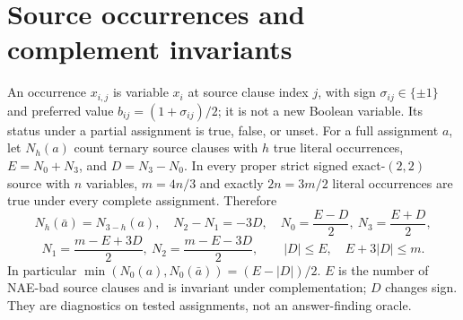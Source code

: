 \documentclass[10pt]{article}
\begin{document}
\section{Source occurrences and complement invariants}
An occurrence $x_{i,j}$ is variable $x_i$ at source clause index $j$, with sign $\sigma_{ij}\in\{\pm1\}$ and preferred value $b_{ij}=(1+\sigma_{ij})/2$; it is not a new Boolean variable. Its status under a partial assignment is true, false, or unset. For a full assignment $a$, let $N_h(a)$ count ternary source clauses with $h$ true literal occurrences, $E=N_0+N_3$, and $D=N_3-N_0$. In every proper strict signed exact-$(2,2)$ source with $n$ variables, $m=4n/3$ and exactly $2n=3m/2$ literal occurrences are true under every complete assignment. Therefore
\[
N_h(\bar a)=N_{3-h}(a),\quad N_2-N_1=-3D,\quad
N_0=\frac{E-D}{2},\ N_3=\frac{E+D}{2},
\]
\[
N_1=\frac{m-E+3D}{2},\ N_2=\frac{m-E-3D}{2},
\qquad |D|\le E,\quad E+3|D|\le m.
\]
In particular $\min(N_0(a),N_0(\bar a))=(E-|D|)/2$.
$E$ is the number of NAE-bad source clauses and is invariant under complementation; $D$ changes sign. They are diagnostics on tested assignments, not an answer-finding oracle.
\end{document}
